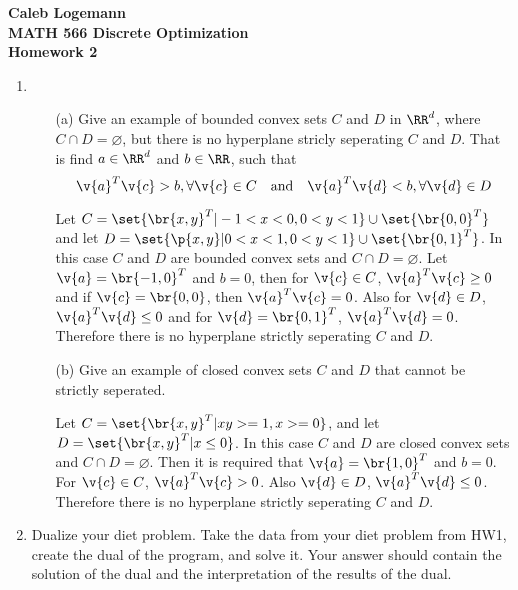\documentclass[11pt, oneside]{article}
\begin{document}
\noindent \textbf{\Large{Caleb Logemann \\
MATH 566 Discrete Optimization\\
Homework 2
}}

%
\begin{enumerate}
    \item %
        \begin{enumerate}
            \item[(a)]
                Give an example of bounded convex sets $C$ and $D$ in $\RR^d$,
                where $C \cap D = \varnothing$, but there is no hyperplane
                stricly seperating $C$ and $D$.
                That is find $a \in \RR^d$ and $b \in \RR$, such that
                \[
                    \v{a}^T\v{c} > b, \forall \v{c} \in C \quad \text{and} \quad \v{a}^T\v{d} < b, \forall \v{d} \in D
                \]

                Let $C = \set{\br{x, y}^T | -1 < x < 0, 0 < y < 1} \cup \set{\br{0, 0}^T}$
                and let $D = \set{\p{x, y} | 0 < x < 1, 0 < y < 1} \cup \set{\br{0, 1}^T}$.
                In this case $C$ and $D$ are bounded convex sets and $C \cap D = \varnothing$.
                Let $\v{a} = \br{-1, 0}^T$ and $b = 0$, then for $\v{c} \in C$,
                $\v{a}^T \v{c} \ge 0$ and if $\v{c} = \br{0, 0}$, then $\v{a}^T \v{c} = 0$.
                Also for $\v{d} \in D$, $\v{a}^T \v{d} \le 0$ and for $\v{d} = \br{0, 1}^T$,
                $\v{a}^T \v{d} = 0$.
                Therefore there is no hyperplane strictly seperating $C$ and $D$.

            \item[(b)]
                Give an example of closed convex sets $C$ and $D$ that cannot
                be strictly seperated.

                Let $C = \set{\br{x, y}^T | xy >= 1, x >= 0}$, and let
                $D = \set{\br{x, y}^T | x \le 0}$.
                In this case $C$ and $D$ are closed convex sets and
                $C \cap D = \varnothing$.
                Then it is required that $\v{a} = \br{1, 0}^T$ and $b = 0$.
                For $\v{c} \in C$, $\v{a}^T \v{c} > 0$.
                Also $\v{d} \in D$, $\v{a}^T \v{d} \le 0$.
                Therefore there is no hyperplane strictly seperating $C$ and $D$.
        \end{enumerate}

    \item %
        Dualize your diet problem.
        Take the data from your diet problem from HW1, create the dual of the
        program, and solve it.
        Your answer should contain the solution of the dual and the
        interpretation of the results of the dual.


\end{enumerate}
\end{document}
